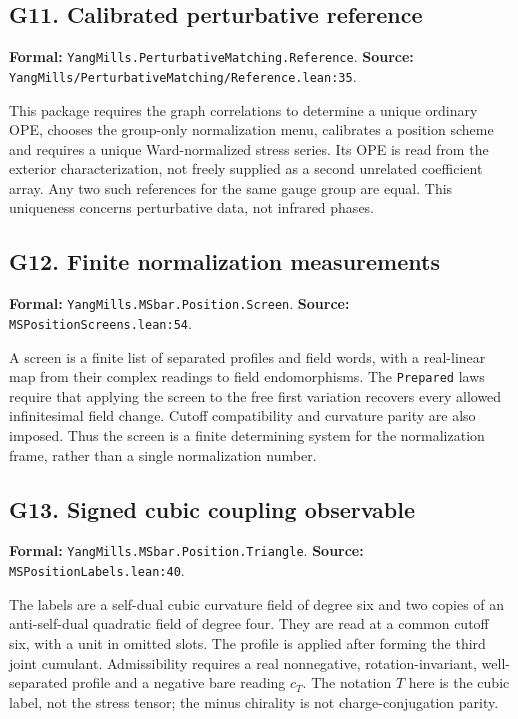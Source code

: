 \documentclass[11pt]{article}
\newcommand{\code}[1]{{\small\nolinkurl{#1}}}
\begin{document}
\subsection*{G11. Calibrated perturbative reference}
\label{gloss:G11}
\textbf{Formal:} \code{YangMills.PerturbativeMatching.Reference}.\newline
\textbf{Source:} \code{YangMills/PerturbativeMatching/Reference.lean:35}.

This package requires the graph correlations to determine a unique
ordinary OPE, chooses the group-only normalization menu, calibrates a
position scheme and requires a unique Ward-normalized stress series.
Its OPE is read from the exterior characterization, not freely supplied
as a second unrelated coefficient array. Any two such references for
the same gauge group are equal. This uniqueness concerns perturbative
data, not infrared phases.

\subsection*{G12. Finite normalization measurements}
\label{gloss:G12}
\textbf{Formal:} \code{YangMills.MSbar.Position.Screen}.\newline
\textbf{Source:} \code{MSPositionScreens.lean:54}.

A screen is a finite list of separated profiles and field words,
with a real-linear map from their complex readings to field
endomorphisms. The \code{Prepared} laws require that applying the screen
to the free first variation recovers every allowed infinitesimal
field change. Cutoff compatibility and curvature parity are also
imposed. Thus the screen is a finite determining system for the
normalization frame, rather than a single normalization number.

\subsection*{G13. Signed cubic coupling observable}
\label{gloss:G13}
\textbf{Formal:} \code{YangMills.MSbar.Position.Triangle}.\newline
\textbf{Source:} \code{MSPositionLabels.lean:40}.

The labels are a self-dual cubic curvature field of degree six
and two copies of an anti-self-dual quadratic field of degree four.
They are read at a common cutoff six, with a unit in omitted slots.
The profile is applied after forming the third joint cumulant.
Admissibility requires a real nonnegative, rotation-invariant,
well-separated profile and a negative bare reading $c_T$.
The notation $T$ here is the cubic label, not the stress tensor;
the minus chirality is not charge-conjugation parity.
\end{document}
